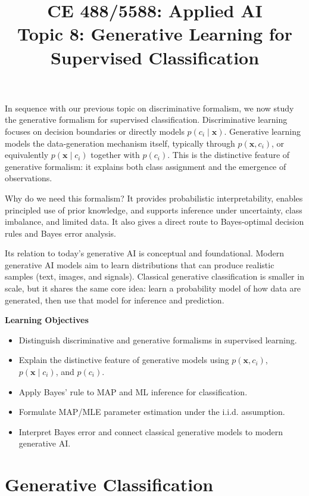 \documentclass[12pt]{article}
\begin{document}
\doublespacing
\title{CE 488/5588: Applied AI \\ \large Topic 8: Generative Learning for Supervised Classification}
\author{}
\date{}
\maketitle


In sequence with our previous topic on discriminative formalism, we now study the generative formalism for supervised classification. Discriminative learning focuses on decision boundaries or directly models \(p(c_i \mid \bm{x})\). Generative learning models the data-generation mechanism itself, typically through \(p(\bm{x}, c_i)\), or equivalently \(p(\bm{x} \mid c_i)\) together with \(p(c_i)\). This is the distinctive feature of generative formalism: it explains both class assignment and the emergence of observations.

Why do we need this formalism? It provides probabilistic interpretability, enables principled use of prior knowledge, and supports inference under uncertainty, class imbalance, and limited data. It also gives a direct route to Bayes-optimal decision rules and Bayes error analysis.

Its relation to today's generative AI is conceptual and foundational. Modern generative AI models aim to learn distributions that can produce realistic samples (text, images, and signals). Classical generative classification is smaller in scale, but it shares the same core idea: learn a probability model of how data are generated, then use that model for inference and prediction.

\textbf{Learning Objectives}
\begin{itemize}
    \item Distinguish discriminative and generative formalisms in supervised learning.
    \item Explain the distinctive feature of generative models using \(p(\bm{x}, c_i)\), \(p(\bm{x} \mid c_i)\), and \(p(c_i)\).
    \item Apply Bayes' rule to MAP and ML inference for classification.
    \item Formulate MAP/MLE parameter estimation under the i.i.d. assumption.
    \item Interpret Bayes error and connect classical generative models to modern generative AI.
\end{itemize}

\section{Generative Classification}
\end{document}
